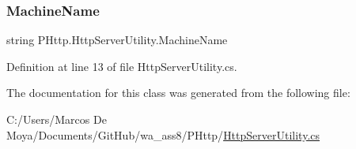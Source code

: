 \subsubsection{\texorpdfstring{Machine\+Name}{MachineName}}
{\footnotesize\ttfamily string P\+Http.\+Http\+Server\+Utility.\+Machine\+Name\hspace{0.3cm}{\ttfamily [get]}}



Definition at line 13 of file Http\+Server\+Utility.\+cs.



The documentation for this class was generated from the following file\+:\begin{DoxyCompactItemize}
\item 
C\+:/\+Users/\+Marcos De Moya/\+Documents/\+Git\+Hub/wa\+\_\+ass8/\+P\+Http/\hyperlink{_http_server_utility_8cs}{Http\+Server\+Utility.\+cs}\end{DoxyCompactItemize}
